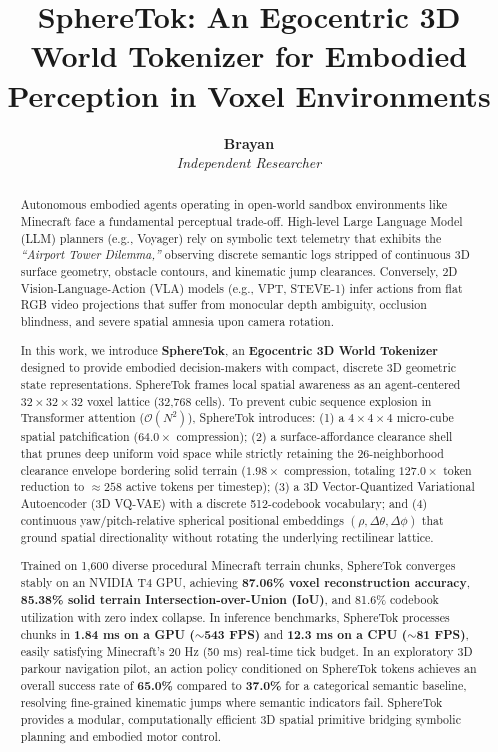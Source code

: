 \documentclass[10pt,twocolumn,letterpaper]{article}
\title{\textbf{SphereTok: An Egocentric 3D World Tokenizer for Embodied Perception in Voxel Environments}}
\author{
  \textbf{Brayan} \\
  \textit{Independent Researcher}
}
\date{}
\begin{document}
\maketitle
\def\thefootnote{*}\def\thefootnote{\arabic{footnote}}

\begin{abstract}
Autonomous embodied agents operating in open-world sandbox environments like Minecraft face a fundamental perceptual trade-off. High-level Large Language Model (LLM) planners (e.g., Voyager) rely on symbolic text telemetry that exhibits the \textit{``Airport Tower Dilemma,''} observing discrete semantic logs stripped of continuous 3D surface geometry, obstacle contours, and kinematic jump clearances. Conversely, 2D Vision-Language-Action (VLA) models (e.g., VPT, STEVE-1) infer actions from flat RGB video projections that suffer from monocular depth ambiguity, occlusion blindness, and severe spatial amnesia upon camera rotation.

In this work, we introduce \textbf{SphereTok}, an \textbf{Egocentric 3D World Tokenizer} designed to provide embodied decision-makers with compact, discrete 3D geometric state representations. SphereTok frames local spatial awareness as an agent-centered $32 \times 32 \times 32$ voxel lattice (32,768 cells). To prevent cubic sequence explosion in Transformer attention ($\mathcal{O}(N^2)$), SphereTok introduces: (1) a $4 \times 4 \times 4$ micro-cube spatial patchification ($64.0\times$ compression); (2) a surface-affordance clearance shell that prunes deep uniform void space while strictly retaining the 26-neighborhood clearance envelope bordering solid terrain ($1.98\times$ compression, totaling $127.0\times$ token reduction to $\approx 258$ active tokens per timestep); (3) a 3D Vector-Quantized Variational Autoencoder (3D VQ-VAE) with a discrete 512-codebook vocabulary; and (4) continuous yaw/pitch-relative spherical positional embeddings $(\rho, \Delta\theta, \Delta\phi)$ that ground spatial directionality without rotating the underlying rectilinear lattice.

Trained on 1,600 diverse procedural Minecraft terrain chunks, SphereTok converges stably on an NVIDIA T4 GPU, achieving \textbf{87.06\% voxel reconstruction accuracy}, \textbf{85.38\% solid terrain Intersection-over-Union (IoU)}, and 81.6\% codebook utilization with zero index collapse. In inference benchmarks, SphereTok processes chunks in \textbf{1.84 ms on a GPU ($\sim$543 FPS)} and \textbf{12.3 ms on a CPU ($\sim$81 FPS)}, easily satisfying Minecraft's 20 Hz (50 ms) real-time tick budget. In an exploratory 3D parkour navigation pilot, an action policy conditioned on SphereTok tokens achieves an overall success rate of \textbf{65.0\%} compared to \textbf{37.0\%} for a categorical semantic baseline, resolving fine-grained kinematic jumps where semantic indicators fail. SphereTok provides a modular, computationally efficient 3D spatial primitive bridging symbolic planning and embodied motor control.
\end{abstract}
\end{document}
